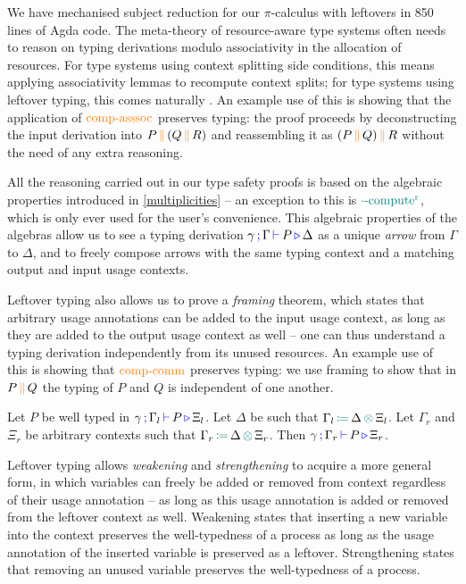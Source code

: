 \documentclass[]{llncs}
\newcommand{\picalc}{$\pi$-calculus}
\newcommand{\type}[1]{\textcolor{blue}{\operatorname{#1}}}
\newcommand{\constr}[1]{\textcolor{orange}{\operatorname{#1}}}
\newcommand{\func}[1]{\textcolor{teal}{\operatorname{#1}}}
\newcommand{\comp}[2]{#1 \, \constr{\parallel} \, #2}
\newcommand{\opctx}[3]{#1 \, \func{\coloneqq} \, #2 \, \func{\otimes} \, #3}
\newcommand{\types}[4]{#1 \, \type{;} \, #2 \, \type{\vdash} \, #3 \, \type{\triangleright} \, #4}
\begin{document}
We have mechanised subject reduction for our \picalc{} with leftovers in 850 lines of Agda code.
The meta-theory of resource-aware type systems often needs to reason on typing derivations modulo associativity in the allocation of resources.
For type systems using context splitting side conditions, this means applying associativity lemmas to recompute context splits; for type systems using leftover typing, this comes naturally .
An example use of this is showing that the application of $\constr{comp-asssoc}$ preserves typing: the proof proceeds by deconstructing the input derivation into $\comp{P}{(\comp{Q}{R})}$ and reassembling it as $\comp{(\comp{P}{Q})}{R}$ without the need of any extra reasoning.

All the reasoning carried out in our type safety proofs is based on the algebraic properties introduced in \autoref{multiplicities} -- an exception to this is $\func{\cdot -compute^r}$, which is only ever used for the user's convenience.
This algebraic properties of the algebras allow us to see a typing derivation $\types{\gamma}{\Gamma}{P}{\Delta}$ as a unique \emph{arrow} from $\Gamma$ to $\Delta$, and to freely compose arrows with the same typing context and a matching output and input usage contexts.

Leftover typing also allows us to prove a \emph{framing} theorem, which states that arbitrary usage annotations can be added to the input usage context, as long as they are added to the output usage context as well -- one can thus understand a typing derivation independently from its unused resources.
An example use of this is showing that $\constr{comp-comm}$ preserves typing: we use framing to show that in $\comp{P}{Q}$ the typing of $P$ and $Q$ is independent of one another.
\begin{nitheorem}[Framing]
  \label{thm:framing}
  Let $P$ be well typed in $\types{\gamma}{\Gamma_l}{P}{\Xi_l}$.
  Let $\Delta$ be such that $\opctx{\Gamma_l}{\Delta}{\Xi_l}$.
  Let $\Gamma_r$ and $\Xi_r$ be arbitrary contexts such that $\opctx{\Gamma_r}{\Delta}{\Xi_r}$.
  Then $\types{\gamma}{\Gamma_r}{P}{\Xi_r}$.
\end{nitheorem}

Leftover typing allows \emph{weakening} and \emph{strengthening} to acquire a more general form, in which variables can freely be added or removed from context regardless of their usage annotation -- as long as this usage annotation is added or removed from the leftover context as well.
Weakening states that inserting a new variable into the context preserves the well-typedness of a process as long as the usage annotation of the inserted variable is preserved as a leftover.
Strengthening states that removing an unused variable preserves the well-typedness of a process.
\end{document}
